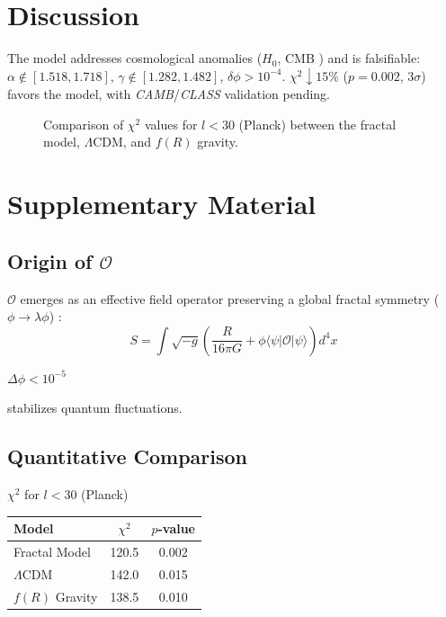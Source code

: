 \documentclass[aps,prl,twocolumn,groupedaddress]{revtex4-2}
\newcommand{\Opp}{\mathcal{O}}
\begin{document}
\section{Discussion}
The model addresses cosmological anomalies (\(H_0\), CMB \cite{divalentino2021,planck}) and is falsifiable: \(\alpha \notin [1.518, 1.718]\), \(\gamma \notin [1.282, 1.482]\), \(\delta \phi > 10^{-4}\). \(\chi^2 \downarrow 15\%\) (\(p = 0.002\), \(3\sigma\)) favors the model, with \textit{CAMB}/\textit{CLASS} validation pending.
\begin{figure}
\centering

\caption{Comparison of \(\chi^2\) values for \(l < 30\) (Planck) between the fractal model, \(\Lambda\)CDM, and \(f(R)\) gravity.}
\label{fig:chi2}
\end{figure}

\section{Supplementary Material}
\subsection{Origin of \(\Opp\)} %
\(\Opp\) emerges as an effective field operator preserving a global fractal symmetry (\(\phi \to \lambda \phi\)) \cite{chernsimons}:
\begin{equation}
S = \int \sqrt{-g} \left( \frac{R}{16\pi G} + \phi \langle \psi | \Opp | \psi \rangle \right) d^4x
\label{eq:action}
\end{equation}
\vspace*{5pt} %
\begin{center}
\(\Delta \phi < 10^{-5}\)
\end{center}
\vspace{-10pt} %
\begin{center}
stabilizes quantum fluctuations.
\end{center}

\vspace{10pt} %
\subsection{Quantitative Comparison}

\centering %
\(\chi^2\) for \(l < 30\) (Planck) \\
\vspace{5pt} %
\begin{tabular}{lcc}
\toprule
\textbf{Model} & \textbf{\(\chi^2\)} & \textbf{\(p\)-value} \\
\midrule
Fractal Model & 120.5 & 0.002 \\
\(\Lambda\)CDM & 142.0 & 0.015 \\
\(f(R)\) Gravity & 138.5 & 0.010 \\
\bottomrule
\end{tabular}
\label{tab:chi2}
\end{document}
